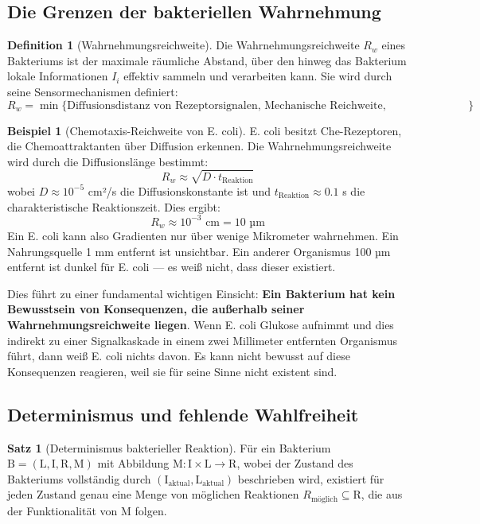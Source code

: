 \documentclass[a4paper,12pt]{article}
\theoremstyle{definition}
\newtheorem{definition}{Definition}
\newtheorem{beispiel}{Beispiel}
\newtheorem{satz}{Satz}
\begin{document}
\subsection{Die Grenzen der bakteriellen Wahrnehmung}

\begin{definition}[Wahrnehmungsreichweite]
Die Wahrnehmungsreichweite $R_w$ eines Bakteriums ist der maximale räumliche Abstand, über den hinweg das Bakterium lokale Informationen $I_i$ effektiv sammeln und verarbeiten kann. Sie wird durch seine Sensormechanismen definiert:
\[
R_w = \min\{\text{Diffusionsdistanz von Rezeptorsignalen, Mechanische Reichweite, Elektrochemische Reichweite}\}
\]
\end{definition}

\begin{beispiel}[Chemotaxis-Reichweite von E. coli]
E. coli besitzt Che-Rezeptoren, die Chemoattraktanten über Diffusion erkennen. Die Wahrnehmungsreichweite wird durch die Diffusionslänge bestimmt:
\[
R_w \approx \sqrt{D \cdot t_{\text{Reaktion}}}
\]
wobei $D \approx 10^{-5}$ cm²/s die Diffusionskonstante ist und $t_{\text{Reaktion}} \approx 0.1$ s die charakteristische Reaktionszeit. Dies ergibt:
\[
R_w \approx 10^{-3} \text{ cm} = 10 \text{ µm}
\]
Ein E. coli kann also Gradienten nur über wenige Mikrometer wahrnehmen. Ein Nahrungsquelle 1 mm entfernt ist unsichtbar. Ein anderer Organismus 100 µm entfernt ist dunkel für E. coli --- es weiß nicht, dass dieser existiert.
\end{beispiel}

Dies führt zu einer fundamental wichtigen Einsicht: \textbf{Ein Bakterium hat kein Bewusstsein von Konsequenzen, die außerhalb seiner Wahrnehmungsreichweite liegen}. Wenn E. coli Glukose aufnimmt und dies indirekt zu einer Signalkaskade in einem zwei Millimeter entfernten Organismus führt, dann weiß E. coli nichts davon. Es kann nicht bewusst auf diese Konsequenzen reagieren, weil sie für seine Sinne nicht existent sind.

\subsection{Determinismus und fehlende Wahlfreiheit}

\begin{satz}[Determinismus bakterieller Reaktion]
\label{satz:determinismus}
Für ein Bakterium $\text{B} = (\text{L}, \text{I}, \text{R}, \text{M})$ mit Abbildung $\text{M}: \text{I} \times \text{L} \to \text{R}$, wobei der Zustand des Bakteriums vollständig durch $(\text{I}_{\text{aktual}}, \text{L}_{\text{aktual}})$ beschrieben wird, existiert für jeden Zustand genau eine Menge von möglichen Reaktionen $R_{\text{möglich}} \subseteq \text{R}$, die aus der Funktionalität von $\text{M}$ folgen.
\end{satz}
\end{document}
